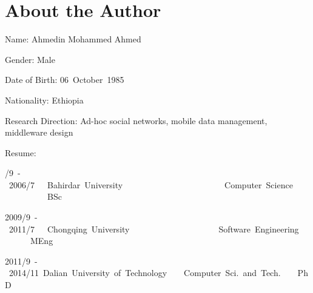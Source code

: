 \chapter*{\hfill About the Author \hfill}

\begin{window}
\end{window}
\ltwelve
Name: Ahmedin Mohammed Ahmed

Gender: Male

Date of Birth: 06~October~1985

Nationality: Ethiopia

Research Direction: Ad-hoc social networks, mobile data management, middleware design

Resume:


/9~-~2006/7~~~Bahirdar~University~~~~~~~~~~~~~~~~~~~~~~~~Computer~Science~~~~~~~~~~~~~~BSc \par
2009/9~-~2011/7~~~Chongqing~University~~~~~~~~~~~~~~~~~~~~~Software~Engineering~~~~~~~~MEng \par
2011/9~-~2014/11~Dalian~University~of~Technology~~~~Computer~Sci.~and~Tech.~~~~PhD
